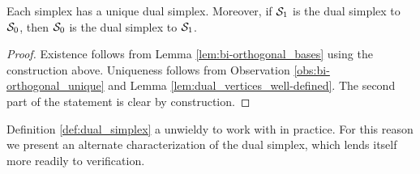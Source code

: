 \begin{theorem}
	\label{thm:dual_simplex}
Each simplex has a unique dual simplex. Moreover, if $\mathcal{S}_1$ is the dual simplex to $\mathcal{S}_0$, then $\mathcal{S}_0$ is the dual simplex to $\mathcal{S}_1$. 
\end{theorem}
\begin{proof}
Existence follows from Lemma \ref{lem:bi-orthogonal_bases} using the construction above. Uniqueness follows from Observation \ref{obs:bi-orthogonal_unique} and Lemma \ref{lem:dual_vertices_well-defined}. The second part of the statement is clear by construction. 
\end{proof}

Definition \ref{def:dual_simplex} a unwieldy to work with in practice. For this reason we present an alternate characterization of the dual simplex, which lends itself more readily to verification. 

